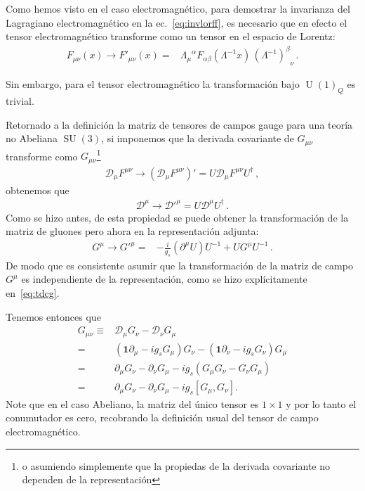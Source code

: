\begin{frame}
Como hemos visto en el caso electromagnético, para demostrar la invarianza del Lagragiano electromagnético en la ec.~\eqref{eq:invlorff}, es necesario que en efecto el tensor electromagnético transforme como un tensor en el espacio de Lorentz:
\begin{align}
  F_{\mu\nu}(x) \to F'_{\mu\nu}(x)  =& { \Lambda_{\mu}}^{\alpha}F_{\alpha\beta}\left( \Lambda^{-1}x \right)\,
                   {\left( \Lambda^{-1} \right)^{\beta}}_{\nu} \,.
\end{align}


Sin embargo, para el tensor electromagnético la transformación bajo $\operatorname{U}(1)_Q$ es trivial.

Retornado a la definición la matriz de tensores de campos gauge para una teoría no Abeliana $\operatorname{SU}(3)$, 
si imponemos que la derivada covariante de $G_{\mu\nu}$ transforme como $G_{\mu\nu}$\footnote{o asumiendo simplemente que la propiedas de la derivada covariante no dependen de la representación}
\begin{align}
  \mathcal{D}_{\mu}F^{\mu\nu} \to \left(  \mathcal{D}_{\mu}F^{\mu\nu}  \right)'=
    U \mathcal{D}_{\mu}F^{\mu\nu} U^{\dagger}\,,
\end{align}
obtenemos que
\begin{align}
{\mathcal{D}}^\mu \to   {\mathcal{D}'}^\mu =U {\mathcal{D}}^\mu U^{\dagger}\,.
\end{align}
Como se hizo antes, de esta propiedad se puede obtener la transformación de la matriz de gluones pero ahora en la representación adjunta:
\begin{align}
 G^{\mu}\to  {G'}^\mu  =&-\frac{i}{g_s}(\partial^\mu U)U^{-1}+ U{G}^\mu U^{-1}\,.  
\end{align}
De modo que es consistente asumir que la transformación de la matriz de  campo $G^{\mu}$ es independiente de la representación, como se hizo explícitamente en~\eqref{eq:tdcg}.

Tenemos entonces que %
\begin{align}
  G_{\mu\nu}\equiv & \mathcal{D}_{\mu} G_{\nu}-\mathcal{D}_{\nu} G_{\mu} \nonumber\\
=&\left( \mathbf{1}\partial_{\mu}-i g_s G_{\mu} \right)G_{\nu}-
\left( \mathbf{1}\partial_{\nu}-i g_s G_{\nu} \right)G_{\mu}\nonumber\\
=& \partial_{\mu}G_{\nu}-\partial_{\nu}G_{\mu}
-ig_s \left(  G_{\mu}G_{\nu}-G_{\nu}G_{\mu}  \right) \nonumber\\
=& \partial_{\mu}G_{\nu}-\partial_{\nu}G_{\mu}
-ig_s \left[  G_{\mu},G_{\nu}  \right] .
\end{align}
Note que en el caso Abeliano, la matriz del único tensor es $1\times1$ y por lo tanto el conumutador es cero, recobrando la definición usual del tensor de campo electromagnético.


\end{frame}
